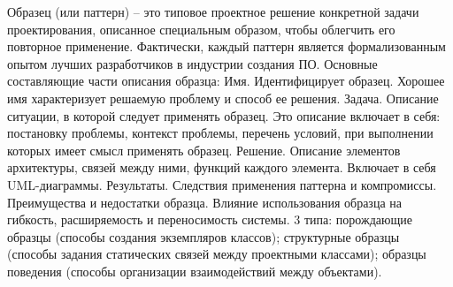 
Образец (или паттерн) – это типовое проектное решение конкретной задачи проектирования, описанное специальным образом, чтобы облегчить его повторное применение. Фактически, каждый паттерн является формализованным опытом лучших разработчиков в индустрии создания ПО. Основные составляющие части описания образца: Имя. Идентифицирует образец. Хорошее имя характеризует решаемую проблему и способ ее решения. Задача. Описание ситуации, в которой следует применять образец. Это описание включает в себя: постановку проблемы, контекст проблемы, перечень условий, при выполнении которых имеет смысл применять образец. Решение. Описание элементов архитектуры, связей между ними, функций каждого элемента. Включает в себя UML-диаграммы. Результаты. Следствия применения паттерна и компромиссы. Преимущества и недостатки образца. Влияние использования образца на гибкость, расширяемость и переносимость системы. 3 типа: порождающие образцы (способы создания экземпляров классов); структурные образцы (способы задания статических связей между проектными классами); образцы поведения (способы организации взаимодействий между объектами).

